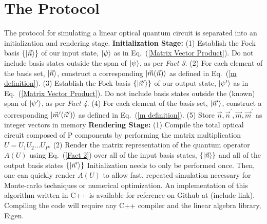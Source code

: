 \documentclass[aps,pra,twocolumn,showpacs,superscriptaddress,floatfix,10pt]{revtex4}
\begin{document}
\section{The Protocol}
\label{Section on Protocol}
\noindent The protocol for simulating a linear optical quantum circuit is separated into an initialization and rendering stage.
\newline
\newline
\textbf{Initialization Stage:}
\newline
\newline
		(1)  Establish the Fock basis $\{\ket{\vec{n}} \}$ of our input state, $\ket{\psi}$ as in Eq.~(\ref{Matrix Vector Product}). Do not include basis states outside the span of $\ket{\psi}$, as per \textit{Fact 3}.
		\newline
		\newline
		(2) For each element of the basis set, $\ket{\vec{n}}$, construct a corresponding $\ket{\vec{m}(\vec{n})}$ as defined in Eq.~(\ref{m definition}).
		\newline
		\newline
		(3) Establish the Fock basis $\{\ket{\vec{n}^\prime}\}$ of our output state, $\ket{\psi^\prime}$ as in Eq.~(\ref{Matrix Vector Product}). Do not include basis states outside the (known) span of $\ket{\psi^\prime}$, as per \textit{Fact 4}.
		\newline
		\newline
		(4)  For each element of the basis set, $\ket{\vec{n}^\prime}$, construct a corresponding $\ket{\vec{m}^\prime(\vec{n}^\prime)}$ as defined in Eq.~(\ref{m definition}).
		\newline
		\newline
		(5) Store $\vec{n}, \vec{n}^\prime, \vec{m}, \vec{m}^\prime$ as integer vectors in memory
		\newline
		\newline
\textbf{Rendering Stage:}
\newline
\newline
		(1)  Compile the total optical circuit composed of P components by performing the matrix multiplication $ U = U_1 U_2 \dots U_P $.
		\newline
		\newline
		(2) Render the matrix representation of the quantum operator $A(U)$ using Eq.~(\ref{Fact 2}) over all of the input basis states, $\{\ket{\vec{n}}\}$ and all of the output basis states $\{\ket{\vec{n}^\prime}\}$
Initialization needs to only be performed once. Then, one can quickly render $A(U)$ to allow fast, repeated simulation necessary for Monte-carlo techniques or numerical optimization.
\newline
\newline
An implementation of this algorithm written in C++ is available for reference on Github at (include link). Compiling the code will require any C++ compiler and the linear algebra library, Eigen\cite{EIGEN}.
\end{document}
